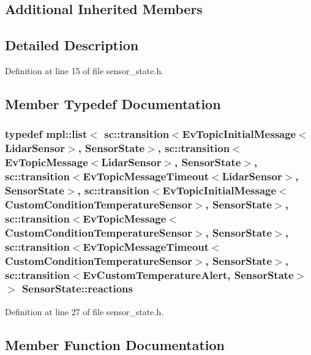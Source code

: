 \subsection*{Additional Inherited Members}


\subsection{Detailed Description}


Definition at line 15 of file sensor\+\_\+state.\+h.



\subsection{Member Typedef Documentation}
\subsubsection[{\texorpdfstring{reactions}{reactions}}]{\setlength{\rightskip}{0pt plus 5cm}typedef mpl\+::list$<$ sc\+::transition$<${\bf Ev\+Topic\+Initial\+Message}$<${\bf Lidar\+Sensor}$>$, {\bf Sensor\+State}$>$, sc\+::transition$<${\bf Ev\+Topic\+Message}$<${\bf Lidar\+Sensor}$>$, {\bf Sensor\+State}$>$, sc\+::transition$<${\bf Ev\+Topic\+Message\+Timeout}$<${\bf Lidar\+Sensor}$>$, {\bf Sensor\+State}$>$, sc\+::transition$<${\bf Ev\+Topic\+Initial\+Message}$<${\bf Custom\+Condition\+Temperature\+Sensor}$>$, {\bf Sensor\+State}$>$, sc\+::transition$<${\bf Ev\+Topic\+Message}$<${\bf Custom\+Condition\+Temperature\+Sensor}$>$, {\bf Sensor\+State}$>$, sc\+::transition$<${\bf Ev\+Topic\+Message\+Timeout}$<${\bf Custom\+Condition\+Temperature\+Sensor}$>$, {\bf Sensor\+State}$>$, sc\+::transition$<${\bf Ev\+Custom\+Temperature\+Alert}, {\bf Sensor\+State}$>$ $>$ {\bf Sensor\+State\+::reactions}}\hypertarget{structSensorState_aad643eee73f46db780c8f30fde51d23f}{}\label{structSensorState_aad643eee73f46db780c8f30fde51d23f}


Definition at line 27 of file sensor\+\_\+state.\+h.



\subsection{Member Function Documentation}
